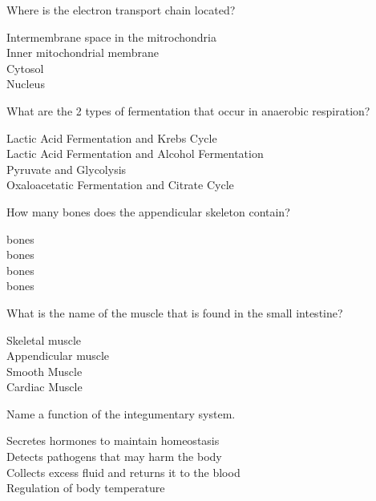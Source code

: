 \documentclass[a4paper,12pt]{exam}
\begin{document}
\begin{questions}
	\question Where is the electron transport chain located?
	
	\begin{oneparchoices}
		\choice Intermembrane space in the mitrochondria
		\\
		\choice Inner mitochondrial membrane
		\\
		\choice Cytosol
		\\
		\choice Nucleus
	\end{oneparchoices}

	\question What are the 2 types of fermentation that occur in anaerobic respiration?
	
	\begin{oneparchoices}
		\choice Lactic Acid Fermentation and Krebs Cycle
		\\
		\choice Lactic Acid Fermentation and Alcohol Fermentation
		\\
		\choice Pyruvate and Glycolysis
		\\
		\choice Oxaloacetatic Fermentation and Citrate Cycle
	\end{oneparchoices}
	
	\question How many bones does the appendicular skeleton contain?
	
	\begin{oneparchoices}
		 bones
		\\
		 bones
		\\
		 bones
		\\
		 bones
	\end{oneparchoices}

	\question What is the name of the muscle that is found in the small intestine?
	
	\begin{oneparchoices}
		\choice Skeletal muscle
		\\
		\choice Appendicular muscle
		\\
		\choice Smooth Muscle
		\\
		\choice Cardiac Muscle
	\end{oneparchoices}

	\question Name a function of the integumentary system.
	
	\begin{oneparchoices}
		\choice Secretes hormones to maintain homeostasis
		\\
		\choice Detects pathogens that may harm the body
		\\
		\choice Collects excess fluid and returns it to the blood
		\\
		\choice Regulation of body temperature
	\end{oneparchoices}


\end{questions}
\end{document}
